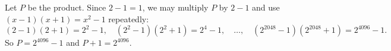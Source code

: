 Let $P$ be the product. Since $2-1=1$, we may multiply $P$ by $2-1$ and use $(x-1)(x+1)=x^2-1$ repeatedly:
\[(2-1)(2+1)=2^2-1,\quad\left(2^2-1\right)\left(2^2+1\right)=2^4-1,\quad\dots,\quad\left(2^{2048}-1\right)\left(2^{2048}+1\right)=2^{4096}-1.\]
So $P=2^{4096}-1$ and $P+1=\boxed{2^{4096}}$.
